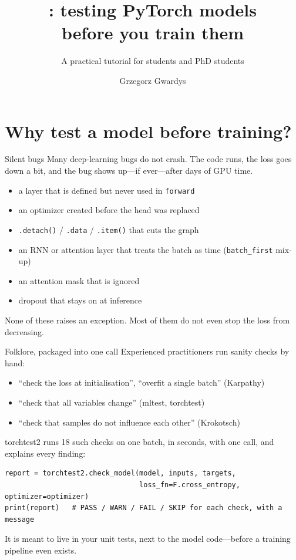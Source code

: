 \documentclass[aspectratio=169,11pt]{beamer}
\title{\tool: testing PyTorch models\\before you train them}
\subtitle{A practical tutorial for students and PhD students}
\author{Grzegorz Gwardys}
\institute{Warsaw University of Technology \;\textbullet\; Promity}
\date{}
\newcommand{\tool}{\textsf{torchtest2}}
\begin{document}
\maketitle

\section{Why test a model before training?}

\begin{frame}{Silent bugs}
  Many deep-learning bugs do \alert{not crash}. The code runs, the loss goes down a bit, and the
  bug shows up---if ever---after days of GPU time.
  \medskip
  \begin{itemize}
    \item a layer that is defined but \alert{never used} in \texttt{forward}
    \item an optimizer created \alert{before the head was replaced}
    \item \texttt{.detach()} / \texttt{.data} / \texttt{.item()} that \alert{cuts the graph}
    \item an RNN or attention layer that treats the \alert{batch as time}
          (\texttt{batch\_first} mix-up)
    \item an attention \alert{mask that is ignored}
    \item dropout that \alert{stays on at inference}
  \end{itemize}
  None of these raises an exception. Most of them do not even stop the loss from decreasing.
\end{frame}

\begin{frame}[fragile]{Folklore, packaged into one call}
  Experienced practitioners run sanity checks by hand:
  \begin{itemize}
    \item ``check the loss at initialisation'', ``overfit a single batch'' (Karpathy)
    \item ``check that all variables change'' (mltest, torchtest)
    \item ``check that samples do not influence each other'' (Krokotsch)
  \end{itemize}
  \medskip
  \tool{} runs \alert{18 such checks} on \alert{one batch}, in \alert{seconds}, with
  \alert{one call}, and explains every finding:
  \begin{lstlisting}
report = torchtest2.check_model(model, inputs, targets,
                                loss_fn=F.cross_entropy, optimizer=optimizer)
print(report)   # PASS / WARN / FAIL / SKIP for each check, with a message
  \end{lstlisting}
  It is meant to live in your \alert{unit tests}, next to the model code---before a training
  pipeline even exists.
\end{frame}
\end{document}
